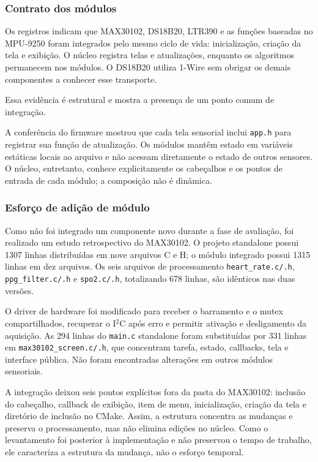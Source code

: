 \documentclass[a4paper,12pt]{article}
\begin{document}
\subsubsection{Contrato dos m\'odulos}


Os registros indicam que MAX30102, DS18B20, LTR390 e as fun\c{c}\~oes baseadas no MPU-9250 foram integrados pelo mesmo ciclo de vida: inicializa\c{c}\~ao, cria\c{c}\~ao da tela e exibi\c{c}\~ao. O n\'ucleo registra telas e atualiza\c{c}\~oes, enquanto os algoritmos permanecem nos m\'odulos. O DS18B20 utiliza 1-Wire sem obrigar os demais componentes a conhecer esse transporte.


Essa evid\^encia \'e estrutural e mostra a presen\c{c}a de um ponto comum de integra\c{c}\~ao.

A confer\^encia do firmware mostrou que cada tela sensorial inclui \texttt{app.h} para registrar sua fun\c{c}\~ao de atualiza\c{c}\~ao. Os m\'odulos mant\^em estado em vari\'aveis est\'aticas locais ao arquivo e n\~ao acessam diretamente o estado de outros sensores. O n\'ucleo, entretanto, conhece explicitamente os cabe\c{c}alhos e os pontos de entrada de cada m\'odulo; a composi\c{c}\~ao n\~ao \'e din\^amica.


\subsubsection{Esfor\c{c}o de adi\c{c}\~ao de m\'odulo}

Como n\~ao foi integrado um componente novo durante a fase de avalia\c{c}\~ao, foi realizado um estudo retrospectivo do MAX30102. O projeto standalone possui 1307 linhas distribu\'idas em nove arquivos C e H; o m\'odulo integrado possui 1315 linhas em dez arquivos. Os seis arquivos de processamento \texttt{heart\_rate.c/.h}, \texttt{ppg\_filter.c/.h} e \texttt{spo2.c/.h}, totalizando 678 linhas, s\~ao id\^enticos nas duas vers\~oes.

O driver de hardware foi modificado para receber o barramento e o mutex compartilhados, recuperar o I$^2$C ap\'os erro e permitir ativa\c{c}\~ao e desligamento da aquisi\c{c}\~ao. As 294 linhas do \texttt{main.c} standalone foram substitu\'idas por 331 linhas em \texttt{max30102\_screen.c/.h}, que concentram tarefa, estado, callbacks, tela e interface p\'ublica. N\~ao foram encontradas altera\c{c}\~oes em outros m\'odulos sensoriais.

A integra\c{c}\~ao deixou seis pontos expl\'icitos fora da pasta do MAX30102: inclus\~ao do cabe\c{c}alho, callback de exibi\c{c}\~ao, item de menu, inicializa\c{c}\~ao, cria\c{c}\~ao da tela e diret\'orio de inclus\~ao no CMake. Assim, a estrutura concentra as mudan\c{c}as e preserva o processamento, mas n\~ao elimina edi\c{c}\~oes no n\'ucleo. Como o levantamento foi posterior \`a implementa\c{c}\~ao e n\~ao preservou o tempo de trabalho, ele caracteriza a estrutura da mudan\c{c}a, n\~ao o esfor\c{c}o temporal.
\end{document}
